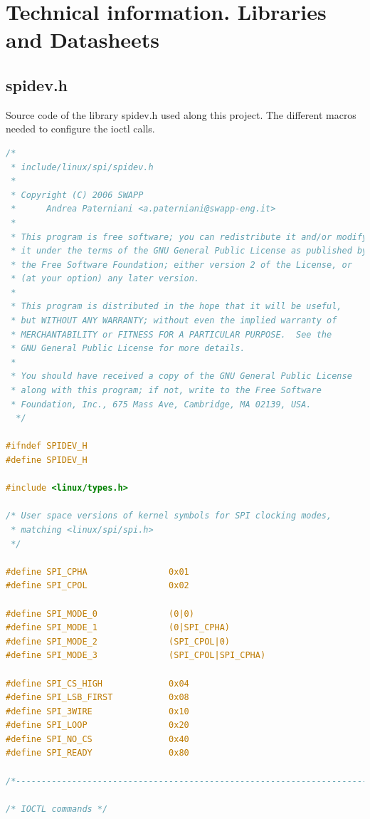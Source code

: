 \chapter{Technical information. Libraries and Datasheets}\label{C:Libraries-Datasheets}
\section{spidev.h}\label{S:linux-spi-spidev}
Source code of the library spidev.h used along this project. The different macros needed to configure the ioctl calls.
\begin{lstlisting}[language=C, caption={linux/spi/spidev.h}]
/*
 * include/linux/spi/spidev.h
 *
 * Copyright (C) 2006 SWAPP
 *      Andrea Paterniani <a.paterniani@swapp-eng.it>
 *
 * This program is free software; you can redistribute it and/or modify
 * it under the terms of the GNU General Public License as published by
 * the Free Software Foundation; either version 2 of the License, or
 * (at your option) any later version.
 *
 * This program is distributed in the hope that it will be useful,
 * but WITHOUT ANY WARRANTY; without even the implied warranty of
 * MERCHANTABILITY or FITNESS FOR A PARTICULAR PURPOSE.  See the
 * GNU General Public License for more details.
 *
 * You should have received a copy of the GNU General Public License
 * along with this program; if not, write to the Free Software
 * Foundation, Inc., 675 Mass Ave, Cambridge, MA 02139, USA.
  */

#ifndef SPIDEV_H
#define SPIDEV_H

#include <linux/types.h>

/* User space versions of kernel symbols for SPI clocking modes,
 * matching <linux/spi/spi.h>
 */

#define SPI_CPHA                0x01
#define SPI_CPOL                0x02

#define SPI_MODE_0              (0|0)
#define SPI_MODE_1              (0|SPI_CPHA)
#define SPI_MODE_2              (SPI_CPOL|0)
#define SPI_MODE_3              (SPI_CPOL|SPI_CPHA)

#define SPI_CS_HIGH             0x04
#define SPI_LSB_FIRST           0x08
#define SPI_3WIRE               0x10
#define SPI_LOOP                0x20
#define SPI_NO_CS               0x40
#define SPI_READY               0x80

/*---------------------------------------------------------------------------*/

/* IOCTL commands */


\end{lstlisting}
